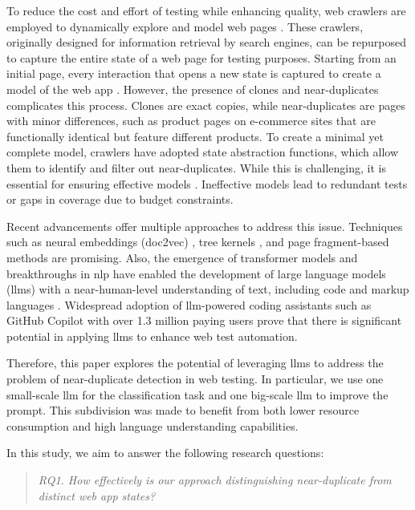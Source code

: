 To reduce the cost and effort of testing while enhancing quality, web crawlers are employed to dynamically explore and model web pages \cite{stocco_neural_2023}. These crawlers, originally designed for information retrieval by search engines, can be repurposed to capture the entire state of a web page for testing purposes. Starting from an initial page, every interaction that opens a new state is captured to create a model of the web app \cite{yandrapally_near-duplicate_2020}. However, the presence of clones and near-duplicates complicates this process. Clones are exact copies, while near-duplicates are pages with minor differences, such as product pages on e-commerce sites that are functionally identical but feature different products. To create a minimal yet complete model, crawlers have adopted state abstraction functions, which allow them to identify and filter out near-duplicates. While this is challenging, it is essential for ensuring effective models \cite{yandrapally_near-duplicate_2020}. Ineffective models lead to redundant tests or gaps in coverage due to budget constraints.

Recent advancements offer multiple approaches to address this issue. Techniques such as neural embeddings (doc2vec) \cite{stocco_neural_2023}, tree kernels \cite{corazza_web_2021}, and page fragment-based methods \cite{yandrapally_fragment-based_2023} are promising. Also, the emergence of transformer models \cite{vaswani_attention_2017} and breakthroughs in \ac{nlp} have enabled the development of large language models (\acp{llm}) with a near-human-level understanding of text, including code and markup languages \cite{touvron_llama_2023}. 
Widespread adoption of \ac{llm}-powered coding assistants such as GitHub Copilot with over 1.3 million paying users \cite{noauthor_ms_nodate} prove that there is significant potential in applying \acp{llm} to enhance web test automation.

Therefore, this paper explores the potential of leveraging \acp{llm} to address the problem of near-duplicate detection in web testing. In particular, we use one small-scale \ac{llm} for the classification task and one big-scale \ac{llm} to improve the prompt. This subdivision was made to benefit from both lower resource consumption and high language understanding capabilities.

In this study, we aim to answer the following research questions:
\begin{quote}
    \label{quote:RQ1}
    \emph{RQ1. How effectively is our approach distinguishing near-duplicate from distinct web app states?}
\end{quote}

